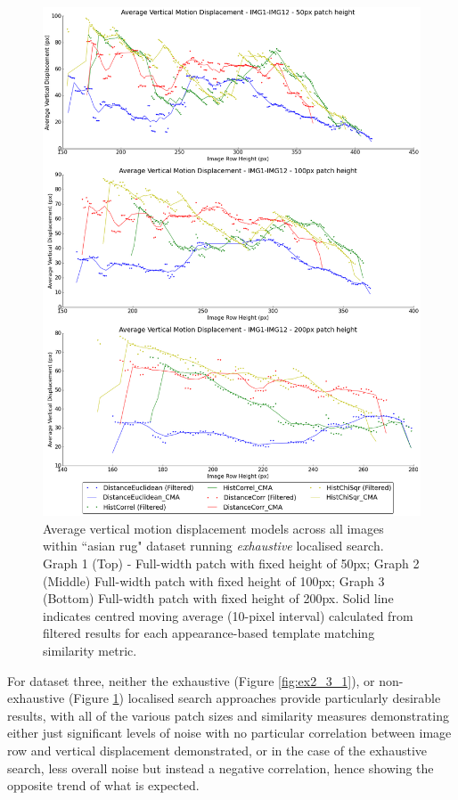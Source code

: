 \clearpage
\begin{figure}[ht!]
\centering
\includegraphics[scale=0.3]{images/results/wiltshire_inside_10cm_non_scaled_exhaustive}
\caption{Average vertical motion displacement models across all images within ``asian rug" dataset running \textit{exhaustive} localised search. Graph 1 (Top) - Full-width patch with fixed height of 50px; Graph 2 (Middle) Full-width patch with fixed height of 100px; Graph 3 (Bottom) Full-width patch with fixed height of 200px. Solid line indicates centred moving average (10-pixel interval) calculated from filtered results for each appearance-based template matching similarity metric.}
\label{fig:ex2_3_2}
\end{figure}

For dataset three, neither the exhaustive (Figure \ref{fig:ex2_3_1}), or non-exhaustive (Figure \ref{fig:ex2_3_2}) localised search approaches provide particularly desirable results, with all of the various patch sizes and similarity measures demonstrating either just significant levels of noise with no particular correlation between image row and vertical displacement demonstrated, or in the case of the exhaustive search, less overall noise but instead a negative correlation, hence showing the opposite trend of what is expected. 

